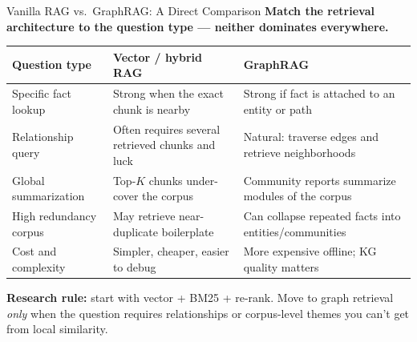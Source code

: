 \begin{frame}{Vanilla RAG vs.\ GraphRAG: A Direct Comparison}
\textbf{Match the retrieval architecture to the question type --- neither dominates everywhere.}

\medskip
\begin{center}
\footnotesize
\begin{tabular}{|p{3.2cm}|p{4.6cm}|p{5.2cm}|}
\hline
\textbf{Question type} & \textbf{Vector / hybrid RAG} & \textbf{GraphRAG} \\ \hline
Specific fact lookup & Strong when the exact chunk is nearby & Strong if fact is attached to an entity or path \\ \hline
Relationship query & Often requires several retrieved chunks and luck & Natural: traverse edges and retrieve neighborhoods \\ \hline
Global summarization & Top-$K$ chunks under-cover the corpus & Community reports summarize modules of the corpus \\ \hline
High redundancy corpus & May retrieve near-duplicate boilerplate & Can collapse repeated facts into entities/communities \\ \hline
Cost and complexity & Simpler, cheaper, easier to debug & More expensive offline; KG quality matters \\ \hline
\end{tabular}
\end{center}

\medskip
\textbf{Research rule:} start with vector + BM25 + re-rank. Move to graph retrieval \emph{only} when the question requires relationships or corpus-level themes you can't get from local similarity.
\end{frame}

